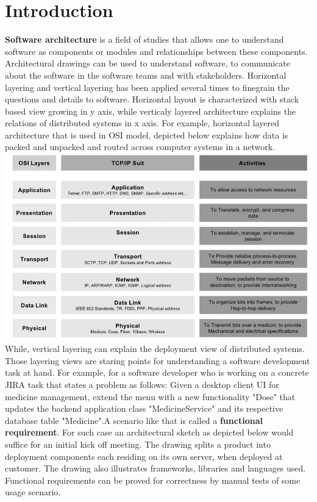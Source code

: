 \chapter{Introduction}
\label{chap:intro}

\textbf{Software architecture} is a field of studies that allows one to understand software as components or modules and relationships between these components. Architectural drawings can be used to understand software, to communicate about the software in the software teams and with stakeholders. 
Horizontal layering and vertical layering has been applied several times to finegrain the questions and details to software. Horizontal layout is characterized with stack based view growing in y axis, while verticaly layered architecture explains the relations of distributed systems in x axis.
For example, horizontal layered architecture that is used in OSI model, depicted below explains how data is packed and unpacked and routed across computer systems in a network. 
\includegraphics[scale=0.5]{osi.png}\\[\fill] 

While, vertical layering can explain the deployment view of distributed systems. Those layering views are staring points for understanding a software development task at hand. 
For example, for a software developer who is working on a concrete JIRA task that states a problem as follows: Given a desktop client UI for medicine management, extend the menu with a new functionality "Dose" that updates the backend application class "MedicineService" and its respective database table "Medicine".A scenario like that is called a \textbf{functional requirement}. For such case an architectural sketch as depicted below would suffice for an initial kick off meeting. The drawing splits a product into deployment components each residing on its own server, when deployed at customer. The drawing also illustrates frameworks, libraries and languages used. Functional requirements can be proved for correctness by manual tests of some usage scenario.

